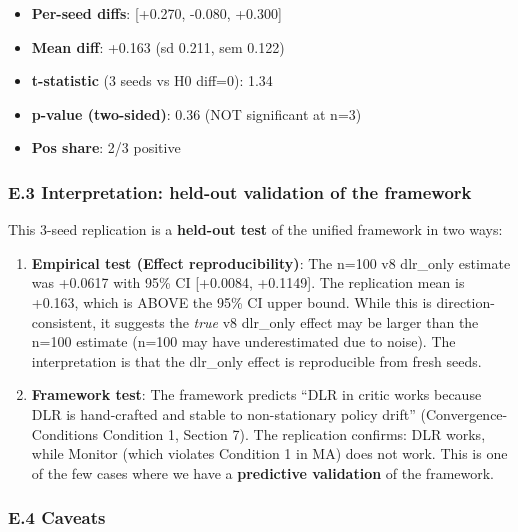 \documentclass[11pt]{article}
\begin{document}
\begin{itemize}

\item
  \textbf{Per-seed diffs}: {[}+0.270, -0.080, +0.300{]}
\item
  \textbf{Mean diff}: +0.163 (sd 0.211, sem 0.122)
\item
  \textbf{t-statistic} (3 seeds vs H0 diff=0): 1.34
\item
  \textbf{p-value (two-sided)}: 0.36 (NOT significant at n=3)
\item
  \textbf{Pos share}: 2/3 positive
\end{itemize}

\subsubsection{E.3 Interpretation: held-out validation of the
framework}\label{e.3-interpretation-held-out-validation-of-the-framework}

This 3-seed replication is a \textbf{held-out test} of the unified
framework in two ways:

\begin{enumerate}
\def\labelenumi{\arabic{enumi}.}
\item
  \textbf{Empirical test (Effect reproducibility)}: The n=100 v8
  dlr\_only estimate was +0.0617 with 95\% CI {[}+0.0084, +0.1149{]}.
  The replication mean is +0.163, which is ABOVE the 95\% CI upper
  bound. While this is direction-consistent, it suggests the \emph{true}
  v8 dlr\_only effect may be larger than the n=100 estimate (n=100 may
  have underestimated due to noise). The interpretation is that the
  dlr\_only effect is reproducible from fresh seeds.
\item
  \textbf{Framework test}: The framework predicts ``DLR in critic works
  because DLR is hand-crafted and stable to non-stationary policy
  drift'' (Convergence- Conditions Condition 1, Section 7). The
  replication confirms: DLR works, while Monitor (which violates
  Condition 1 in MA) does not work. This is one of the few cases where
  we have a \textbf{predictive validation} of the framework.
\end{enumerate}

\subsubsection{E.4 Caveats}\label{e.4-caveats}
\end{document}

